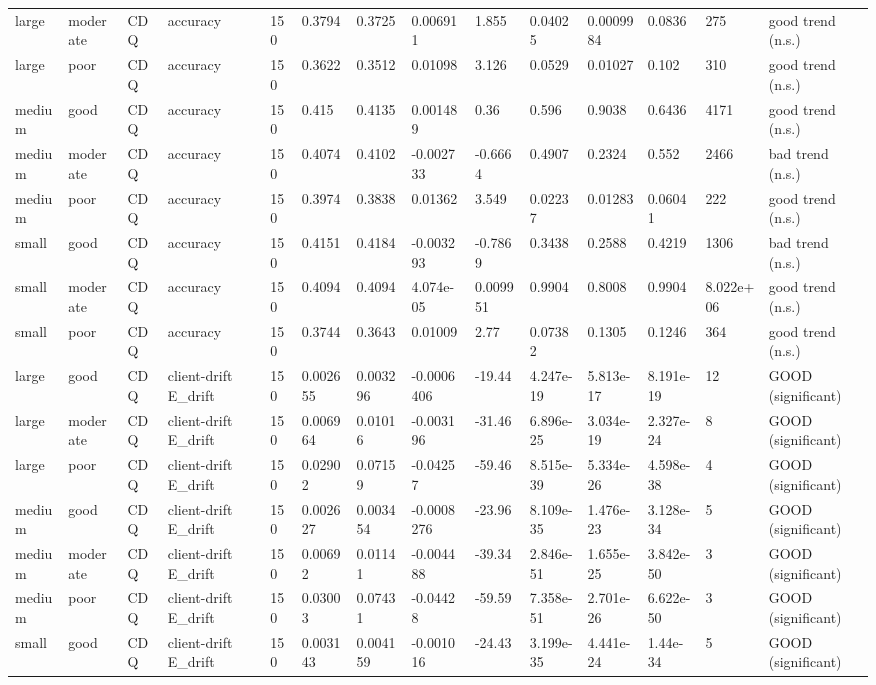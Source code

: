 \begin{table}[t]
\begin{tabular}{llllllllllllll}
large & moderate & CDQ & accuracy & 150 & 0.3794 & 0.3725 & 0.006911 & 1.855 & 0.04025 & 0.0009984 & 0.0836 & 275 & good trend (n.s.) \\
large & poor & CDQ & accuracy & 150 & 0.3622 & 0.3512 & 0.01098 & 3.126 & 0.0529 & 0.01027 & 0.102 & 310 & good trend (n.s.) \\
medium & good & CDQ & accuracy & 150 & 0.415 & 0.4135 & 0.001489 & 0.36 & 0.596 & 0.9038 & 0.6436 & 4171 & good trend (n.s.) \\
medium & moderate & CDQ & accuracy & 150 & 0.4074 & 0.4102 & -0.002733 & -0.6664 & 0.4907 & 0.2324 & 0.552 & 2466 & bad trend (n.s.) \\
medium & poor & CDQ & accuracy & 150 & 0.3974 & 0.3838 & 0.01362 & 3.549 & 0.02237 & 0.01283 & 0.06041 & 222 & good trend (n.s.) \\
small & good & CDQ & accuracy & 150 & 0.4151 & 0.4184 & -0.003293 & -0.7869 & 0.3438 & 0.2588 & 0.4219 & 1306 & bad trend (n.s.) \\
small & moderate & CDQ & accuracy & 150 & 0.4094 & 0.4094 & 4.074e-05 & 0.009951 & 0.9904 & 0.8008 & 0.9904 & 8.022e+06 & good trend (n.s.) \\
small & poor & CDQ & accuracy & 150 & 0.3744 & 0.3643 & 0.01009 & 2.77 & 0.07382 & 0.1305 & 0.1246 & 364 & good trend (n.s.) \\
large & good & CDQ & client-drift E\_drift & 150 & 0.002655 & 0.003296 & -0.0006406 & -19.44 & 4.247e-19 & 5.813e-17 & 8.191e-19 & 12 & GOOD (significant) \\
large & moderate & CDQ & client-drift E\_drift & 150 & 0.006964 & 0.01016 & -0.003196 & -31.46 & 6.896e-25 & 3.034e-19 & 2.327e-24 & 8 & GOOD (significant) \\
large & poor & CDQ & client-drift E\_drift & 150 & 0.02902 & 0.07159 & -0.04257 & -59.46 & 8.515e-39 & 5.334e-26 & 4.598e-38 & 4 & GOOD (significant) \\
medium & good & CDQ & client-drift E\_drift & 150 & 0.002627 & 0.003454 & -0.0008276 & -23.96 & 8.109e-35 & 1.476e-23 & 3.128e-34 & 5 & GOOD (significant) \\
medium & moderate & CDQ & client-drift E\_drift & 150 & 0.00692 & 0.01141 & -0.004488 & -39.34 & 2.846e-51 & 1.655e-25 & 3.842e-50 & 3 & GOOD (significant) \\
medium & poor & CDQ & client-drift E\_drift & 150 & 0.03003 & 0.07431 & -0.04428 & -59.59 & 7.358e-51 & 2.701e-26 & 6.622e-50 & 3 & GOOD (significant) \\
small & good & CDQ & client-drift E\_drift & 150 & 0.003143 & 0.004159 & -0.001016 & -24.43 & 3.199e-35 & 4.441e-24 & 1.44e-34 & 5 & GOOD (significant) \\

\end{tabular}
\end{table}
